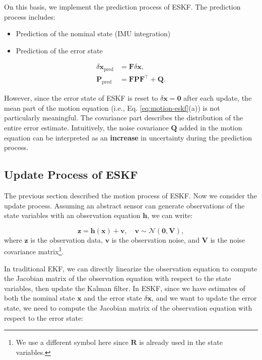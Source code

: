 On this basis, we implement the prediction process of ESKF. The prediction process includes:
\begin{itemize}
	\item Prediction of the nominal state (IMU integration)
	\item Prediction of the error state
\end{itemize}
\begin{subequations}\label{eq:motion-eskf}
	\begin{align}
		\delta \bm{x}_{\mathrm{pred}} &= \bm{F} \delta \bm{x}, \\
		\bm{P}_{\mathrm{pred}} &= \bm{F} \bm{P} \bm{F}^\top + \bm{Q}.
	\end{align}
\end{subequations}

However, since the error state of ESKF is reset to $\delta \bm{x} = \bm{0}$ after each update, the mean part of the motion equation (i.e., Eq. \eqref{eq:motion-eskf}(a)) is not particularly meaningful. The covariance part describes the distribution of the entire error estimate. Intuitively, the noise covariance $\bm{Q}$ added in the motion equation can be interpreted as an \textbf{increase} in uncertainty during the prediction process.

\subsection{Update Process of ESKF}
\label{subsec:3.4.4}
The previous section described the motion process of ESKF. Now we consider the update process. Assuming an abstract sensor can generate observations of the state variables with an observation equation $\bm{h}$, we can write:

\begin{equation}\label{eq:observation-model}
	\bm{z} = \bm{h}(\bm{x}) + \bm{v}, \quad \bm{v} \sim \mathcal{N}(\bm{0}, \bm{V}),
\end{equation}
where $\bm{z}$ is the observation data, $\bm{v}$ is the observation noise, and $\bm{V}$ is the noise covariance matrix\footnote{We use a different symbol here since $\bm{R}$ is already used in the state variables.}.

In traditional EKF, we can directly linearize the observation equation to compute the Jacobian matrix of the observation equation with respect to the state variables, then update the Kalman filter. In ESKF, since we have estimates of both the nominal state $\bm{x}$ and the error state $\delta \bm{x}$, and we want to update the error state, we need to compute the Jacobian matrix of the observation equation with respect to the error state:

